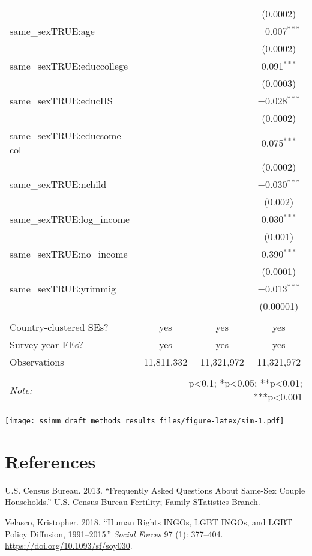 \documentclass[11pt,]{article}
\begin{document}
\begin{table}[!htbp]
\begin{tabular}{@{\extracolsep{5pt}}lccc}
  &  &  & (0.0002) \\ 
  same\_sexTRUE:age &  &  & $-$0.007$^{***}$ \\ 
  &  &  & (0.0002) \\ 
  same\_sexTRUE:educcollege &  &  & 0.091$^{***}$ \\ 
  &  &  & (0.0003) \\ 
  same\_sexTRUE:educHS &  &  & $-$0.028$^{***}$ \\ 
  &  &  & (0.0002) \\ 
  same\_sexTRUE:educsome col &  &  & 0.075$^{***}$ \\ 
  &  &  & (0.0002) \\ 
  same\_sexTRUE:nchild &  &  & $-$0.030$^{***}$ \\ 
  &  &  & (0.002) \\ 
  same\_sexTRUE:log\_income &  &  & 0.030$^{***}$ \\ 
  &  &  & (0.001) \\ 
  same\_sexTRUE:no\_income &  &  & 0.390$^{***}$ \\ 
  &  &  & (0.0001) \\ 
  same\_sexTRUE:yrimmig &  &  & $-$0.013$^{***}$ \\ 
  &  &  & (0.00001) \\ 
 \hline \\[-1.8ex] 
Country-clustered SEs? & yes & yes & yes \\ 
Survey year FEs? & yes & yes & yes \\ 
Observations & 11,811,332 & 11,321,972 & 11,321,972 \\ 
\hline 
\hline \\[-1.8ex] 
\textit{Note:}  & \multicolumn{3}{r}{+p<0.1; *p<0.05; **p<0.01; ***p<0.001} \\ 
\end{tabular} 
\end{table}

\texttt{[image: ssimm\_draft\_methods\_results\_files/figure-latex/sim-1.pdf]}

\hypertarget{references}{%
\section{References}\label{references}}

\setlength{\parindent}{-0.2in}
\setlength{\leftskip}{0.2in}
\setlength{\parskip}{8pt}

\noindent

\hypertarget{refs}{}
\leavevmode\hypertarget{ref-u.s.censusbureau_2013}{}%
U.S. Census Bureau. 2013. ``Frequently Asked Questions About Same-Sex Couple Households.'' U.S. Census Bureau Fertility; Family STatistics Branch.

\leavevmode\hypertarget{ref-velasco_2018}{}%
Velasco, Kristopher. 2018. ``Human Rights INGOs, LGBT INGOs, and LGBT Policy Diffusion, 1991--2015.'' \emph{Social Forces} 97 (1): 377--404. \url{https://doi.org/10.1093/sf/soy030}.

\newpage
\singlespacing 
\end{document}
